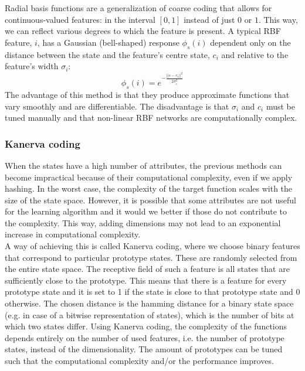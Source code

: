 \documentclass[a4paper]{article}
\begin{document}
Radial basis functions are a generalization of coarse coding that allows for continuous-valued features: in the interval $[0,1]$ instead of just $0$ or $1$. This way, we can reflect various degrees to which the feature is present. A typical RBF feature, $i$, has a Gaussian (bell-shaped) response $\phi_s(i)$ dependent only on the distance between the state and the feature's centre state, $c_i$ and relative to the feature's width $\sigma_i$:
\begin{equation}
\phi_s(i) = e^{-\frac{||s-c_i||^2}{2 \sigma^2_i}}
\end{equation}
The advantage of this method is that they produce approximate functions that vary smoothly and are differentiable. The disadvantage is that $\sigma_i$ and $c_i$ must be tuned manually and that non-linear RBF networks are computationally complex.\\

\subsubsection{Kanerva coding}
When the states have a high number of attributes, the previous methods can become impractical because of their computational complexity, even if we apply hashing. In the worst case, the complexity of the target function scales with the size of the state space. However, it is possible that some attributes are not useful for the learning algorithm and it would we better if those do not contribute to the complexity. This way, adding dimensions may not lead to an exponential increase in computational complexity.\\
A way of achieving this is called Kanerva coding, where we choose binary features that correspond to particular prototype states. These are randomly selected from the entire state space. The receptive field of such a feature is all states that are sufficiently close to the prototype. This means that there is a feature for every prototype state and it is set to 1 if the state is close to that prototype state and 0 otherwise. The chosen distance is the hamming distance for a binary state space (e.g. in case of a bitwise representation of states), which is the number of bits at which two states differ. 
Using Kanerva coding, the complexity of the functions depends entirely on the number of used features, i.e. the number of prototype states, instead of the dimensionality. The amount of prototypes can be tuned such that the computational complexity and/or the performance improves.\\
\end{document}
